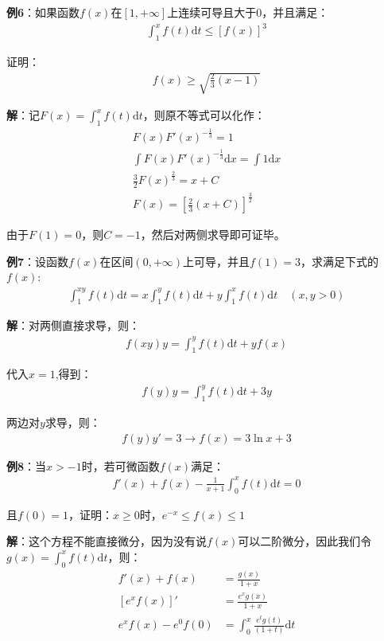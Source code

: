 \documentclass{ctexart}
\let\oldtextbf\textbf
\renewcommand{\textbf}[1]{\textcolor{brown!50!red}{\oldtextbf{#1}}}
\begin{document}
\textbf{\color{brown!50!red}例6}：如果函数$f(x)$在$[1,+\infty]$上连续可导且大于0，并且满足：
\begin{align*}
    \int_1^x f(t)\mathrm{d}
t\leq [f(x)]^3
\end{align*}

证明：
\begin{align*}
    f(x)\geq \sqrt{\frac{2}{3}(x-1)}
\end{align*}

\textbf{\color{brown!50!red}解}：记$F(x)=\int_1^x f(t)\mathrm{d}t$，则原不等式可以化作：
\begin{align*} 
 F(x)F'(x)^{-\frac{1}{3} }=1\\
\int F(x)F'(x)^{-\frac{1}{3} }\mathrm{d}x =\int1\mathrm{d}x\\
\frac{3}{2}F(x)^\frac{2}{3}=x+C\\
F(x)=[\frac{2}{3}(x+C)]^\frac{3}{2}   
\end{align*}

由于$F(1)=0$，则$C=-1$，然后对两侧求导即可证毕。

\textbf{\color{brown!50!red}例7}：设函数$f(x)$在区间$(0,+\infty)$上可导，并且$f(1)=3$，求满足下式的$f(x)$:
\begin{align*}
    \int_1^{xy}f(t)\mathrm{d}t=x\int_1^y f(t)\mathrm{d}t+y\int_1^xf(t)\mathrm{d}t\quad(x,y>0)
\end{align*}

\textbf{\color{brown!50!red}解}：对两侧直接求导，则：
\begin{align*}
    f(xy)y=\int_1^yf(t)\mathrm{d}t+yf(x)
\end{align*}

代入$x=1$,得到：
\begin{align*}
f(y)y=\int_1^yf(t)\mathrm{d}t+3y
\end{align*}

两边对$y$求导，则：
\begin{align*}
    f(y)y'=3\to f(x)=3\ln x+3
\end{align*}

\textbf{\color{brown!50!red}例8}：当$x>-1$时，若可微函数$f(x)$满足：
\begin{align*}
    f'(x)+f(x)-\frac{1}{x+1}\int_0^x f(t)\mathrm{d}t=0
\end{align*}

且$f(0)=1$，证明：$x\geq 0$时，$e^{-x}\leq f(x)\leq 1$

\textbf{\color{brown!50!red}解}：这个方程不能直接微分，因为没有说$f(x)$可以二阶微分，因此我们令$g(x)=\int_0^x f(t)\mathrm{d}t$，则：
\begin{align*}
    f'(x)+f(x)&=\frac{g(x)}{1+x}\\
    [e^xf(x)]'&=\frac{e^xg(x)}{1+x}\\
    e^xf(x)-e^0f(0)&=\int_0^x\frac{e^tg(t)}{(1+t)}\mathrm{d}t
\end{align*}
\end{document}
